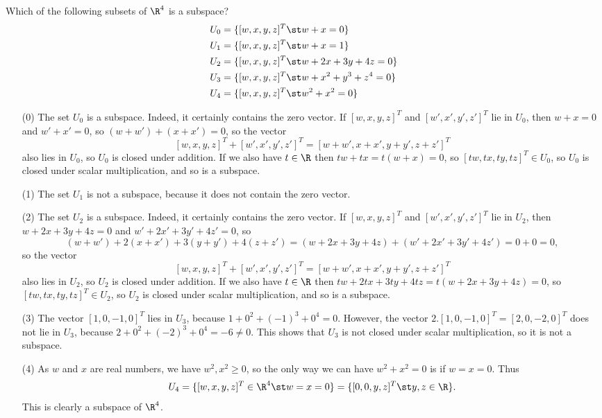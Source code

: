 \begin{exercise}\label{ex-check-subspace}
 Which of the following subsets of $\R^4$ is a subspace?
 \begin{align*}
  U_0 &= \{[w,x,y,z]^T \st w+x=0\} \\
  U_1 &= \{[w,x,y,z]^T \st w+x=1\} \\
  U_2 &= \{[w,x,y,z]^T \st w+2x+3y+4z=0\} \\
  U_3 &= \{[w,x,y,z]^T \st w+x^2+y^3+z^4=0\} \\
  U_4 &= \{[w,x,y,z]^T \st w^2 + x^2=0\}
 \end{align*}
\end{exercise}
\begin{solution}
 \begin{itemize}
  \item[(0)] The set $U_0$ is a subspace.  Indeed, it
   certainly contains the zero vector.  If $[w,x,y,z]^T$ and
   $[w',x',y',z']^T$ lie in $U_0$, then $w+x=0$ and $w'+x'=0$,
   so $(w+w')+(x+x')=0$, so the vector
   \[ [w,x,y,z]^T+[w',x',y',z']^T=[w+w',x+x',y+y',z+z']^T \]
   also lies in $U_0$, so $U_0$ is closed under addition.
   If we also have $t\in\R$ then $tw+tx=t(w+x)=0$, so
   $[tw,tx,ty,tz]^T\in U_0$, so $U_0$ is closed under scalar
   multiplication, and so is a subspace.
  \item[(1)] The set $U_1$ is not a subspace, because it
   does not contain the zero vector.
  \item[(2)] The set $U_2$ is a subspace.  Indeed, it
   certainly contains the zero vector.  If $[w,x,y,z]^T$ and
   $[w',x',y',z']^T$ lie in $U_2$, then $w+2x+3y+4z=0$ and
   $w'+2x'+3y'+4z'=0$, so 
   \[ (w+w')+2(x+x')+3(y+y')+4(z+z') = 
      (w+2x+3y+4z)+(w'+2x'+3y'+4z') = 0+0 = 0,
   \] 
   so the vector
   \[ [w,x,y,z]^T+[w',x',y',z']^T=[w+w',x+x',y+y',z+z']^T \]
   also lies in $U_2$, so $U_2$ is closed under addition.  If we
   also have $t\in\R$ then $tw+2tx+3ty+4tz=t(w+2x+3y+4z)=0$,
   so $[tw,tx,ty,tz]^T\in U_2$, so $U_2$ is closed under
   scalar multiplication, and so is a subspace.
  \item[(3)] The vector $[1,0,-1,0]^T$ lies in $U_3$, because
   $1+0^2+(-1)^3+0^4=0$.  However, the vector
   $2.[1,0,-1,0]^T=[2,0,-2,0]^T$ does not lie in $U_3$, because
   $2+0^2+(-2)^3+0^4=-6\neq 0$.  This shows that $U_3$ is
   not closed under scalar multiplication, so it is not a
   subspace.
  \item[(4)] As $w$ and $x$ are real numbers, we have
   $w^2,x^2\geq 0$, so the only way we can have $w^2+x^2=0$
   is if $w=x=0$.  Thus 
   \[ U_4 = \{[w,x,y,z]^T\in\R^4\st w=x=0\} = 
            \{[0,0,y,z]^T\st y,z\in\R\}. 
   \]
   This is clearly a subspace of $\R^4$.
 \end{itemize}
\end{solution}

